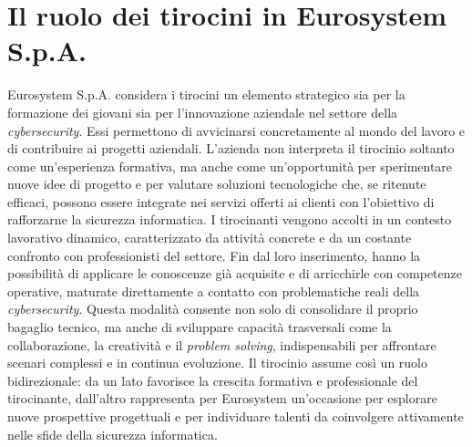 \section{Il ruolo dei tirocini in Eurosystem S.p.A.}
Eurosystem S.p.A. considera i tirocini un elemento strategico sia per la formazione dei giovani sia per l'innovazione aziendale nel settore della \textit{cybersecurity}.  
Essi permettono di avvicinarsi concretamente al mondo del lavoro e di contribuire ai progetti aziendali.  
L'azienda non interpreta il tirocinio soltanto come un'esperienza formativa, ma anche come un'opportunità per sperimentare nuove idee di progetto e per valutare soluzioni tecnologiche che, se ritenute efficaci, possono essere integrate nei servizi offerti ai clienti con l'obiettivo di rafforzarne la sicurezza informatica.  
I tirocinanti vengono accolti in un contesto lavorativo dinamico, caratterizzato da attività concrete e da un costante confronto con professionisti del settore.  
Fin dal loro inserimento, hanno la possibilità di applicare le conoscenze già acquisite e di arricchirle con competenze operative, maturate direttamente a contatto con problematiche reali della \textit{cybersecurity}.  
Questa modalità consente non solo di consolidare il proprio bagaglio tecnico, ma anche di sviluppare capacità trasversali come la collaborazione, la creatività e il \textit{problem solving}, indispensabili per affrontare scenari complessi e in continua evoluzione.  
Il tirocinio assume così un ruolo bidirezionale: da un lato favorisce la crescita formativa e professionale del tirocinante, dall'altro rappresenta per Eurosystem un'occasione per esplorare nuove prospettive progettuali e per individuare talenti da coinvolgere attivamente nelle sfide della sicurezza informatica.  